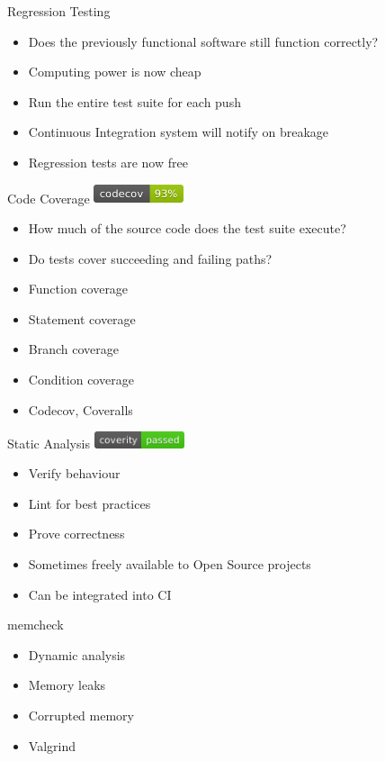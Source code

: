\documentclass{beamer}
\begin{document}
\begin{frame}{Regression Testing}
	\begin{itemize}
		\item Does the previously functional software still function correctly?
		\item Computing power is now cheap
		\item Run the entire test suite for each push
		\item Continuous Integration system will notify on breakage
		\item Regression tests are now free
	\end{itemize}
\end{frame}

\begin{frame}{Code Coverage}
	\includegraphics[width=100px]{codecov.png}
	\begin{itemize}
		\item How much of the source code does the test suite execute?
		\item Do tests cover succeeding and failing paths?
		\item Function coverage
		\item Statement coverage
		\item Branch coverage
		\item Condition coverage
		\item Codecov, Coveralls
	\end{itemize}
\end{frame}

\begin{frame}{Static Analysis}
	\includegraphics[width=100px]{coverity.png}
	\begin{itemize}
		\item Verify behaviour
		\item Lint for best practices
		\item Prove correctness
		\item Sometimes freely available to Open Source projects
		\item Can be integrated into CI
	\end{itemize}
\end{frame}

\begin{frame}{memcheck}
	\begin{itemize}
		\item Dynamic analysis
		\item Memory leaks
		\item Corrupted memory
		\item Valgrind
	\end{itemize}
\end{frame}
\end{document}
